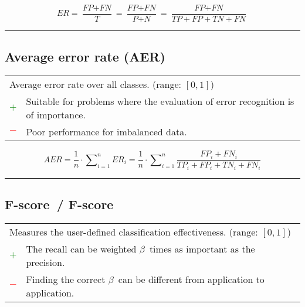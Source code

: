 \documentclass{article}
\begin{document}
\begin{equation}
	\textit{ER} = \dfrac{\textit{FP} + \textit{FN}}{\textit{T}} = \dfrac{\textit{FP} + \textit{FN}}{\textit{P} + \textit{N}} = \dfrac{\textit{FP} + \textit{FN}}{\textit{TP} + \textit{FP} + \textit{TN} + \textit{FN}}
%
	\label{equation:ER}
\end{equation}

\hrule


\subsection[Average error rate (AER)]{Average error rate (AER) \cite{hamamoto1998gabor, han2016variable}}

\begin{table}[H]\centering
	\begin{tabular}{m{}m{}}
		\multicolumn{2}{m{0.95\textwidth}}{Average error rate over all classes. (range: $[0, 1]$)} \\
		\textcolor{Green}{$+$} & Suitable for problems where the evaluation of error recognition is of importance. \\
		\textcolor{Red}{$-$}   & Poor performance for imbalanced data.
	\end{tabular}
\end{table}

\begin{equation}
	\textit{AER} = \dfrac{1}{n} \cdot \sum\nolimits_{i = 1}^n \textit{ER}_i = \dfrac{1}{n} \cdot \sum\nolimits_{i = 1}^n \dfrac{\textit{FP}_i + \textit{FN}_i}{\textit{TP}_i + \textit{FP}_i + \textit{TN}_i + \textit{FN}_i}
%
	\label{equation:AER}
\end{equation}

\hrule


\subsection[F-score~/ F\textbeta-score]{F-score~/ F\textbeta-score \cite{van2004geometry, taha2015metrics}}

\begin{table}[H]\centering
	\begin{tabular}{m{}m{}}
		\multicolumn{2}{m{0.95\textwidth}}{Measures the user-defined classification effectiveness. (range: $[0, 1]$)} \\
		\textcolor{Green}{$+$} & The recall can be weighted $\beta$~times as important as the precision. \\
		\textcolor{Red}{$-$}   & Finding the correct $\beta$~can be different from application to application.
	\end{tabular}
\end{table}
\end{document}
